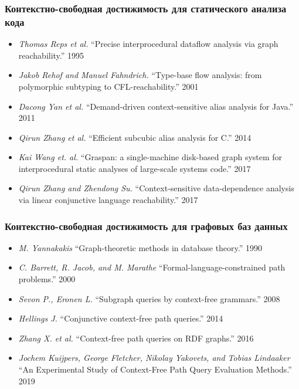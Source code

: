 \documentclass[xcolor=table]{beamer}
\begin{document}
\begin{frame} \frametitle{Контекстно-свободная достижимость для статического анализа кода}

  \begin{itemize}
      \item \emph{Thomas Reps et al.} ``Precise interprocedural dataflow analysis via graph reachability.'' 1995
      \item \emph{Jakob Rehof and Manuel Fahndrich.} ``Type-base flow analysis: from polymorphic subtyping to CFL-reachability.'' 2001
      \item \emph{Dacong Yan et al.} ``Demand-driven context-sensitive alias analysis for Java.'' 2011
      \item \emph{Qirun Zhang et al.}  ``Efficient subcubic alias analysis for C.'' 2014
      \item \emph{Kai Wang et. al.} ``Graspan: a single-machine disk-based graph system for interprocedural static analyses of large-scale systems code.'' 2017
      \item \emph{Qirun Zhang and Zhendong Su.} ``Context-sensitive data-dependence analysis via linear conjunctive language reachability.'' 2017
  \end{itemize}

\end{frame}


\begin{frame}[fragile] \frametitle{Контекстно-свободная достижимость для графовых баз данных}

  \begin{itemize}
      \item \emph{M. Yannakakis} ``Graph-theoretic methods in database theory.'' 1990
      \item \emph{C. Barrett, R. Jacob, and M. Marathe} ``Formal-language-constrained path problems.'' 2000
      \item \emph{Sevon P., Eronen L.} ``Subgraph queries by context-free grammars.'' 2008
      \item \emph{Hellings J.} ``Conjunctive context-free path queries.'' 2014
      \item \emph{Zhang X. et al.} ``Context-free path queries on RDF graphs.'' 2016
      \item \emph{Jochem Kuijpers, George Fletcher, Nikolay Yakovets, and Tobias Lindaaker} ``An Experimental Study of Context-Free Path Query Evaluation Methods.'' 2019
  \end{itemize}

\end{frame}
\end{document}
